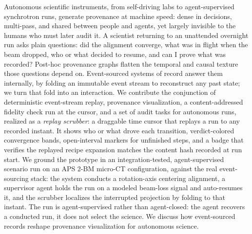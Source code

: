 Autonomous scientific instruments, from self-driving labs to
agent-supervised synchrotron runs, generate provenance at machine speed: dense
in decisions, multi-pass, and shared between people and agents, yet largely
invisible to the humans who must later audit it. A scientist returning to an
unattended overnight run asks plain questions: did the alignment converge, what
was in flight when the beam dropped, who or what decided to resume, and can I
prove what was recorded? Post-hoc provenance graphs flatten the temporal and
causal texture those questions depend on. Event-sourced systems of record answer
them internally, by folding an immutable event stream to reconstruct any past
state; we turn that fold into an interaction. We contribute the conjunction
of deterministic event-stream replay, provenance visualization, a
content-addressed fidelity check run at the cursor, and a set of audit tasks for
autonomous runs, realized as a \emph{replay scrubber}: a draggable time cursor
that replays a run to any recorded instant. It shows who or what drove each
transition, verdict-colored convergence bands, open-interval markers for
unfinished steps, and a badge that verifies the replayed recipe expansion matches
the content hash recorded at run start. We ground the prototype in an
integration-tested, agent-supervised scenario run on an APS 2-BM micro-CT
configuration, against the real event-sourcing stack: the system conducts a
rotation-axis centering alignment, a supervisor agent holds the run on a modeled
beam-loss signal and auto-resumes it, and the scrubber localizes the interrupted
projection by folding to that instant. The run is agent-supervised rather than
agent-closed: the agent recovers a conducted run, it does not select the science.
We discuss how event-sourced records reshape provenance visualization for
autonomous science.
